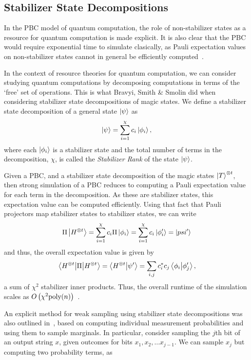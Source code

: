 \subsection{Stabilizer State Decompositions}
In the PBC model of quantum computation, the role of non-stabilizer states as a resource for quantum computation is made explicit. It is also clear that the PBC would require exponential time to simulate clasically, as Pauli expectation values on non-stabilizer states cannot in general be efficiently computed~\cite{Gottesman1998b}.\par
In the context of resource theories for quantum computation, we can consider studying quantum computations by decomposing computations in terms of the `free' set of operations. This is what Bravyi, Smith \& Smolin did when considering stabilizer state decompositions of magic states. We define a stabilizer state decomposition of a general state $\ket{\psi}$ as
\begin{equation}
\ket{\psi} = \sum_{i=1}^{\chi}c_{i}\ket{\phi_{i}},
\label{eq:stab_state_decomposition}
\end{equation}
where each $\ket{\phi_{i}}$ is a stabilizer state and the total number of terms in the decomposition, $\chi$, is called the \emph{Stabilizer Rank} of the state $\ket{\psi}$.\par
Given a PBC, and a stabilizer state decomposition of the magic states $\ket{T}^{\otimes t}$, then strong simulation of a PBC reduces to computing a Pauli expectation value for each term in the decomposition. As these are stabilizer states, this expectation value can be computed efficiently. Using that fact that Pauli projectors map stabilizer states to stabilizer states, we can write
\[\Pi\ket{H^{\otimes t}} = \sum_{i=1}^{\chi}c_{i}\Pi\ket{\phi_{i}}=\sum_{i=1}^{\chi}c_{i}\ket{\phi_{i}'}=\ket{psi'}\]
and thus, the overall expectation value is given by
\begin{equation}
\matrixel{H^{\otimes t}}{\Pi}{H^{\otimes t}} = \braket{H^{\otimes t}}{\psi'} = \sum_{i,j}c_{i}^{*}c_{j}\braket{\phi_{i}}{\phi'_{j}},
\end{equation}
a sum of $\chi^{2}$ stabilizer inner products. Thus, the overall runtime of the simulation scales as $O\left(\chi^{2}\text{poly}(n)\right)$~\cite{Bravyi2015}.\par
An explicit method for weak sampling using stabilizer state decompositions was also outlined in~\cite{Bravyi2015}, based on computing individual measurement probabilities and using them to sample marginals. In particular, consider sampling the $j$th bit of an output string $x$, given outcomes for bits $x_{1},x_{2},\dots x_{j-1}$. We can sample $x_{j}$ but computing two probability terms, as~\cite{Bravyi2016}

